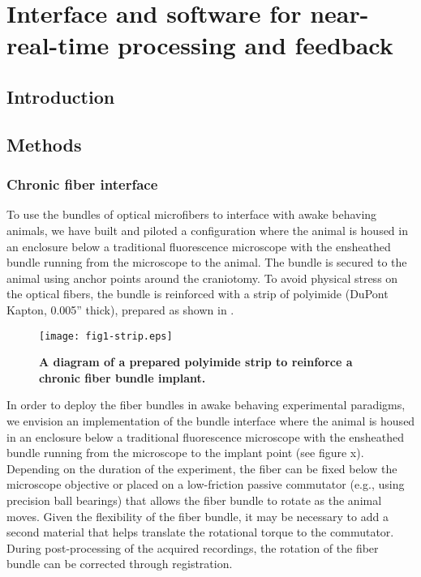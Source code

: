 \chapter{Interface and software for near-real-time processing and feedback}
\label{chapter:processing}

\thispagestyle{myheadings}

\graphicspath{{6_Processing/Figures/}}

\section{Introduction}


\section{Methods}


\subsection{Chronic fiber interface}

To use the bundles of optical microfibers to interface 
with awake behaving animals, we have built and piloted 
a configuration where the animal is housed in an enclosure 
below a traditional fluorescence microscope with the 
ensheathed bundle running from the microscope to 
the animal. The bundle is secured to the animal using 
anchor points around the craniotomy. To avoid physical 
stress on the optical fibers, the bundle is reinforced 
with a strip of polyimide (DuPont Kapton, 0.005'' thick),
prepared as shown in .

\begin{figure}
\texttt{[image: fig1-strip.eps]}
\caption[Polyimide to reinforce fiber bundle]{\textbf{A diagram
of a prepared polyimide strip to reinforce a chronic fiber 
bundle implant.} 
}
\label{fig:software}
\end{figure}


In order to deploy the fiber bundles in awake behaving experimental 
paradigms, we envision an implementation of the bundle interface where
 the animal is housed in an enclosure below a traditional fluorescence
 microscope with the ensheathed bundle running from the microscope to 
the implant point (see figure x). Depending on the duration of the 
experiment, the fiber can be fixed below the microscope objective or 
placed on a low-friction passive commutator (e.g., using precision 
ball bearings) that allows the fiber bundle to rotate as the animal 
moves. Given the flexibility of the fiber bundle, it may be necessary 
to add a second material that helps translate the rotational torque to
 the commutator. During post-processing of the acquired recordings, 
the rotation of the fiber bundle can be corrected through 
registration.

